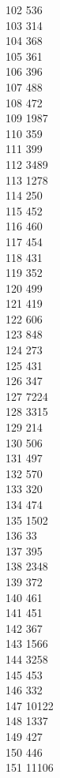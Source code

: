 { 102	536 \\
 103	314 \\
 104	368 \\
 105	361 \\
 106	396 \\
 107	488 \\
 108	472 \\
 109	1987 \\
 110	359 \\
 111	399 \\
 112	3489 \\
 113	1278 \\
 114	250 \\
 115	452 \\
 116	460 \\
 117	454 \\
 118	431 \\
 119	352 \\
 120	499 \\
 121	419 \\
 122	606 \\
 123	848 \\
 124	273 \\
 125	431 \\
 126	347 \\
 127	7224 \\
 128	3315 \\
 129	214 \\
 130	506 \\
 131	497 \\
 132	570 \\
 133	320 \\
 134	474 \\
 135	1502 \\
 136	33 \\
 137	395 \\
 138	2348 \\
 139	372 \\
 140	461 \\
 141	451 \\
 142	367 \\
 143	1566 \\
 144	3258 \\
 145	453 \\
 146	332 \\
 147	10122 \\
 148	1337 \\
 149	427 \\
 150	446 \\
 151	11106 \\
}
